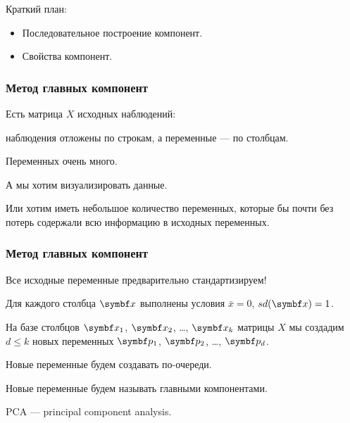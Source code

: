 
\begin{frame} %


\end{frame}



\begin{frame}{Краткий план:}
  \begin{itemize}[<+->]
    \item Последовательное построение компонент.
    \item Свойства компонент.
  \end{itemize}

\end{frame}




\begin{frame}
  \frametitle{Метод главных компонент}


  Есть матрица $X$ исходных наблюдений:

  наблюдения отложены по строкам, а переменные — по столбцам. \pause


  Переменных очень много. \pause


  А мы хотим визуализировать данные. \pause


  Или хотим иметь небольшое количество переменных, которые бы почти без потерь 
  содержали всю информацию в исходных переменных. 


\end{frame}


\begin{frame}
  \frametitle{Метод главных компонент}

  Все исходные переменные предварительно стандартизируем! \pause

  Для каждого столбца $\bx$ выполнены условия $\bar x =0$, $sd(\bx)=1$. \pause


  На базе столбцов $\bx_1$, $\bx_2$, \ldots, $\bx_k$ матрицы $X$ мы создадим 
  $d\leq k$ новых переменных $\bp_1$, $\bp_2$, \ldots, $\bp_d$. \pause

  Новые переменные будем создавать по-очереди. \pause

  Новые переменные будем называть \alert{главными компонентами}.

  PCA — \alert{principal component analysis}.

\end{frame}


